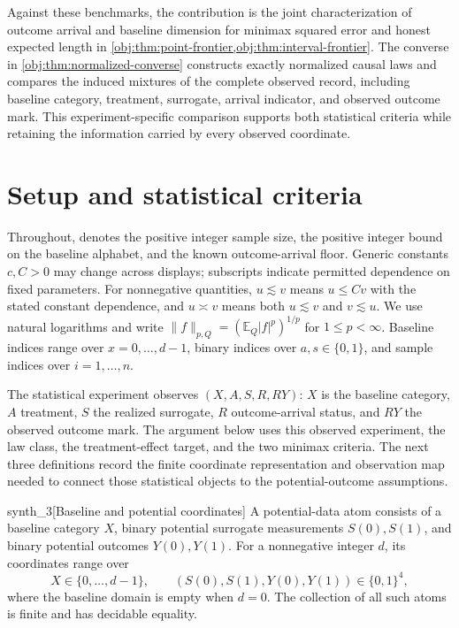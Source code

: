 \documentclass[11pt]{article}
\begin{document}
Against these benchmarks, the contribution is the joint characterization of outcome arrival and baseline dimension for minimax squared error and honest expected length in \cref{obj:thm:point-frontier,obj:thm:interval-frontier}. The converse in \cref{obj:thm:normalized-converse} constructs exactly normalized causal laws and compares the induced mixtures of the complete observed record, including baseline category, treatment, surrogate, arrival indicator, and observed outcome mark. This experiment-specific comparison supports both statistical criteria while retaining the information carried by every observed coordinate.


\section{Setup and statistical criteria}

Throughout,  denotes the positive integer sample size,  the positive integer bound on the baseline alphabet, and  the known outcome-arrival floor. Generic constants \(c,C>0\) may change across displays; subscripts indicate permitted dependence on fixed parameters. For nonnegative quantities, \(u\lesssim v\) means \(u\le Cv\) with the stated constant dependence, and \(u\asymp v\) means both \(u\lesssim v\) and \(v\lesssim u\). We use natural logarithms and write \(\|f\|_{p,Q}=(\mathbb E_Q|f|^p)^{1/p}\) for \(1\le p<\infty\). Baseline indices range over \(x=0,\ldots,d-1\), binary indices over \(a,s\in\{0,1\}\), and sample indices over \(i=1,\ldots,n\).

The statistical experiment observes \((X,A,S,R,RY)\): \(X\) is the baseline category, \(A\) treatment, \(S\) the realized surrogate, \(R\) outcome-arrival status, and \(RY\) the observed outcome mark. The argument below uses this observed experiment, the law class, the treatment-effect target, and the two minimax criteria. The next three definitions record the finite coordinate representation and observation map needed to connect those statistical objects to the potential-outcome assumptions.

\begin{definitionv}{synth_3}[Baseline and potential coordinates]
A potential-data atom consists of a baseline category \(X\), binary potential surrogate measurements \(S(0),S(1)\), and binary potential outcomes \(Y(0),Y(1)\). For a nonnegative integer \(d\), its coordinates range over
\[
X\in\{0,\ldots,d-1\},
\qquad
(S(0),S(1),Y(0),Y(1))\in\{0,1\}^{4},
\]
where the baseline domain is empty when \(d=0\). The collection of all such atoms is finite and has decidable equality.
\end{definitionv}
\end{document}
